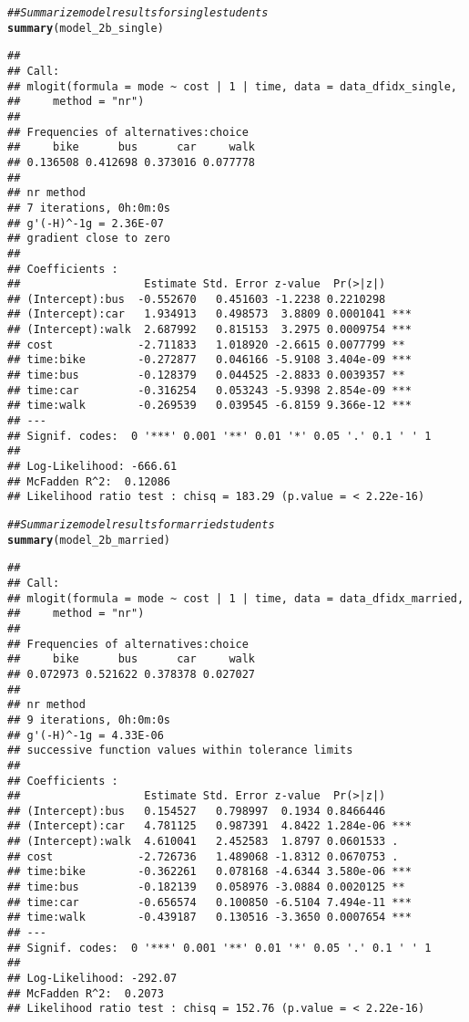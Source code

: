 \documentclass[11pt,letterpaper]{article}\usepackage[]{graphicx}\usepackage[]{xcolor}
\makeatletter
\newcommand{\hlcom}[1]{\textcolor[rgb]{0.678,0.584,0.686}{\textit{#1}}}%
\newcommand{\hlstd}[1]{\textcolor[rgb]{0.345,0.345,0.345}{#1}}%
\newcommand{\hlkwd}[1]{\textcolor[rgb]{0.737,0.353,0.396}{\textbf{#1}}}%
\newenvironment{kframe}{%
 \def\at@end@of@kframe{}%
 \ifinner\ifhmode%
  \def\at@end@of@kframe{\end{minipage}}%
  \begin{minipage}{\columnwidth}%
 \fi\fi%
 \def\FrameCommand##1{\hskip\@totalleftmargin \hskip-\fboxsep
 \colorbox{shadecolor}{##1}\hskip-\fboxsep
     \hskip-\linewidth \hskip-\@totalleftmargin \hskip\columnwidth}%
 \MakeFramed {\advance\hsize-\width
   \@totalleftmargin\z@ \linewidth\hsize
   \@setminipage}}%
 {\par\unskip\endMakeFramed%
 \at@end@of@kframe}
\newenvironment{knitrout}{}{} %
\makeatother
\begin{document}
\begin{enumerate}[label=\alph*., leftmargin=*]
\begin{enumerate}[label=\roman*.]
\begin{knitrout}
\color{fgcolor}\begin{kframe}
\begin{alltt}
\hlcom{## Summarize model results for single students}
\hlkwd{summary}\hlstd{(model_2b_single)}
\end{alltt}
\begin{verbatim}
## 
## Call:
## mlogit(formula = mode ~ cost | 1 | time, data = data_dfidx_single, 
##     method = "nr")
## 
## Frequencies of alternatives:choice
##     bike      bus      car     walk 
## 0.136508 0.412698 0.373016 0.077778 
## 
## nr method
## 7 iterations, 0h:0m:0s 
## g'(-H)^-1g = 2.36E-07 
## gradient close to zero 
## 
## Coefficients :
##                   Estimate Std. Error z-value  Pr(>|z|)    
## (Intercept):bus  -0.552670   0.451603 -1.2238 0.2210298    
## (Intercept):car   1.934913   0.498573  3.8809 0.0001041 ***
## (Intercept):walk  2.687992   0.815153  3.2975 0.0009754 ***
## cost             -2.711833   1.018920 -2.6615 0.0077799 ** 
## time:bike        -0.272877   0.046166 -5.9108 3.404e-09 ***
## time:bus         -0.128379   0.044525 -2.8833 0.0039357 ** 
## time:car         -0.316254   0.053243 -5.9398 2.854e-09 ***
## time:walk        -0.269539   0.039545 -6.8159 9.366e-12 ***
## ---
## Signif. codes:  0 '***' 0.001 '**' 0.01 '*' 0.05 '.' 0.1 ' ' 1
## 
## Log-Likelihood: -666.61
## McFadden R^2:  0.12086 
## Likelihood ratio test : chisq = 183.29 (p.value = < 2.22e-16)
\end{verbatim}
\begin{alltt}
\hlcom{## Summarize model results for married students}
\hlkwd{summary}\hlstd{(model_2b_married)}
\end{alltt}
\begin{verbatim}
## 
## Call:
## mlogit(formula = mode ~ cost | 1 | time, data = data_dfidx_married, 
##     method = "nr")
## 
## Frequencies of alternatives:choice
##     bike      bus      car     walk 
## 0.072973 0.521622 0.378378 0.027027 
## 
## nr method
## 9 iterations, 0h:0m:0s 
## g'(-H)^-1g = 4.33E-06 
## successive function values within tolerance limits 
## 
## Coefficients :
##                   Estimate Std. Error z-value  Pr(>|z|)    
## (Intercept):bus   0.154527   0.798997  0.1934 0.8466446    
## (Intercept):car   4.781125   0.987391  4.8422 1.284e-06 ***
## (Intercept):walk  4.610041   2.452583  1.8797 0.0601533 .  
## cost             -2.726736   1.489068 -1.8312 0.0670753 .  
## time:bike        -0.362261   0.078168 -4.6344 3.580e-06 ***
## time:bus         -0.182139   0.058976 -3.0884 0.0020125 ** 
## time:car         -0.656574   0.100850 -6.5104 7.494e-11 ***
## time:walk        -0.439187   0.130516 -3.3650 0.0007654 ***
## ---
## Signif. codes:  0 '***' 0.001 '**' 0.01 '*' 0.05 '.' 0.1 ' ' 1
## 
## Log-Likelihood: -292.07
## McFadden R^2:  0.2073 
## Likelihood ratio test : chisq = 152.76 (p.value = < 2.22e-16)
\end{verbatim}
\end{kframe}
\end{knitrout}


\end{enumerate}
\end{enumerate}
\end{document}
